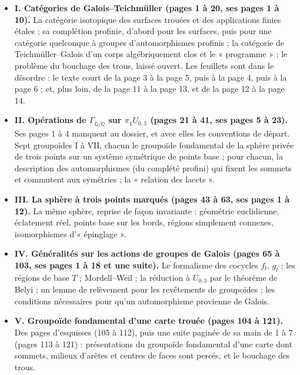 \documentclass[11pt,a4paper]{article}
\begin{document}
\begin{itemize}
\item \textbf{I. Catégories de Galois–Teichmüller (pages 1 à 20, ses pages 1
à 10).} La catégorie isotopique des surfaces trouées et des applications
finies étales ; sa complétion profinie, d'abord pour les surfaces, puis pour
une catégorie quelconque à groupes d'automorphismes profinis ; la catégorie de
Teichmüller–Galois d'un corps algébriquement clos et le « programme » ; le
problème du bouchage des trous, laissé ouvert. Les feuillets sont dans le
désordre : le texte court de la page 3 à la page 5, puis à la page 4, puis à
la page 6 ; et, plus loin, de la page 11 à la page 13, et de la page 12 à la
page 14.
\item \textbf{II. Opérations de $\Gamma_{\overline{\mathbb{Q}}/\mathbb{Q}}$
sur $\pi_1 U_{0,3}$ (pages 21 à 41, ses pages 5 à 23).} Ses pages 1 à 4
manquent au dossier, et avec elles les conventions de départ. Sept
groupoïdes $\mathrm{I}$ à $\mathrm{VII}$, chacun le groupoïde fondamental de
la sphère privée de trois points sur un système symétrique de points base ;
pour chacun, la description des automorphismes (du complété profini) qui
fixent les sommets et commutent aux symétries ; la « relation des lacets ».
\item \textbf{III. La sphère à trois points marqués (pages 43 à 63, ses pages
1 à 12).} La même sphère, reprise de façon invariante : géométrie euclidienne,
éclatement réel, points base sur les bords, régions simplement connexes,
isomorphismes d'« épinglage ».
\item \textbf{IV. Généralités sur les actions de groupes de Galois (pages 65 à
103, ses pages 1 à 18 et une suite).} Le formalisme des cocycles $f_l$,
$g_l$ ; les régions de base $T$ ; Mordell–Weil ; la réduction à $U_{0,3}$
par le théorème de Belyi ; un lemme de relèvement pour les revêtements de
groupoïdes ; les conditions nécessaires pour qu'un automorphisme provienne de
Galois.
\item \textbf{V. Groupoïde fondamental d'une carte trouée (pages 104 à 121).}
Des pages d'esquisses (105 à 112), puis une suite paginée de sa main de 1 à 7
(pages 113 à 121) : présentations du groupoïde fondamental d'une carte dont
sommets, milieux d'arêtes et centres de faces sont percés, et le bouchage des
trous.
\end{itemize}
\end{document}
